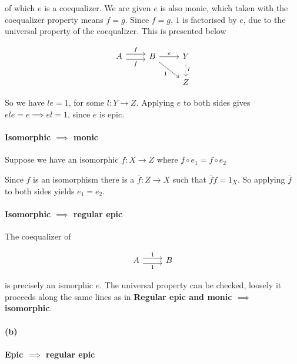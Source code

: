 \documentclass{article}
\begin{document}
of which $e$ is a coequalizer. We are given $e$ is also monic, which taken with the coequalizer property means $f=g$. Since $f=g$, $1$ is factorised by $e$, due to the universal property of the coequalizer. This is presented below

\begin{equation*}
\begin{tikzcd}
A \ar[r,shift left=.75ex,"f"]
  \ar[r,shift right=.75ex,swap,"f"]
&
B \ar[r,"e"] \ar[dr,swap,"1"]
&
Y \ar[d,densely dotted, "l"]
\\
& & Z
\end{tikzcd}
\end{equation*}

So we have $le=1$, for some $l\colon Y \rightarrow Z$. Applying $e$ to both sides gives $ele=e \implies el=1$, since $e$ is epic.

\paragraph{Isomorphic $\implies$ monic}

Suppose we have an isomorphic $f: X \rightarrow Z$ where
$f\circ e_1 = f\circ e_2$

Since $f$ is an isomorphism there is a $\overline{f}:Z\rightarrow X$ such that $\overline{f}f=1_X$. So applying $\overline{f}$ to both sides yields $e_1=e_2$.

\paragraph{Isomorphic $\implies$ regular epic}

The coequalizer of

\begin{equation*}
\label{eqn5143}
\begin{tikzcd}
 A \ar[r,shift left=.75ex,"1"]
   \ar[r,shift right=.75ex,swap,"1"] & B
\end{tikzcd}
\end{equation*}

is precisely an ismorphic $e$. The universal property can be checked, loosely it proceeds along the same lines as in \textbf{Regular epic and monic $\implies$ isomorphic}.

\paragraph{(b)}

\paragraph{Epic $\implies$ regular epic}
\end{document}
